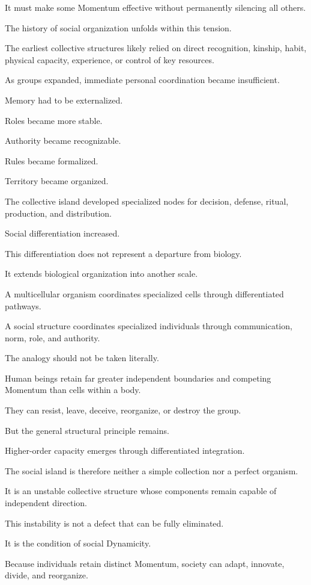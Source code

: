 It must make some Momentum effective without permanently silencing all others.

The history of social organization unfolds within this tension.

The earliest collective structures likely relied on direct recognition, kinship, habit, physical capacity, experience, or control of key resources.

As groups expanded, immediate personal coordination became insufficient.

Memory had to be externalized.

Roles became more stable.

Authority became recognizable.

Rules became formalized.

Territory became organized.

The collective island developed specialized nodes for decision, defense, ritual, production, and distribution.

Social differentiation increased.

This differentiation does not represent a departure from biology.

It extends biological organization into another scale.

A multicellular organism coordinates specialized cells through differentiated pathways.

A social structure coordinates specialized individuals through communication, norm, role, and authority.

The analogy should not be taken literally.

Human beings retain far greater independent boundaries and competing Momentum than cells within a body.

They can resist, leave, deceive, reorganize, or destroy the group.

But the general structural principle remains.

Higher-order capacity emerges through differentiated integration.

The social island is therefore neither a simple collection nor a perfect organism.

It is an unstable collective structure whose components remain capable of independent direction.

This instability is not a defect that can be fully eliminated.

It is the condition of social Dynamicity.

Because individuals retain distinct Momentum, society can adapt, innovate, divide, and reorganize.

